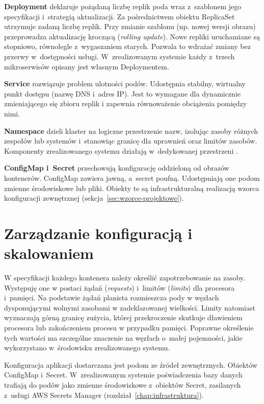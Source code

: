 \textbf{Deployment} deklaruje pożądaną liczbę replik poda wraz z~szablonem jego specyfikacji i~strategią
aktualizacji. Za pośrednictwem obiektu ReplicaSet utrzymuje zadaną liczbę replik. Przy zmianie szablonu (np.
nowej wersji obrazu) przeprowadza aktualizację kroczącą (\emph{rolling update}). Nowe repliki uruchamiane są
stopniowo, równolegle z~wygaszaniem starych. Pozwala to wdrażać zmiany bez przerwy w~dostępności usługi.
W~zrealizowanym systemie każdy z~trzech mikroserwisów opisany jest własnym Deploymentem.

\textbf{Service} rozwiązuje problem ulotności podów. Udostępnia stabilny, wirtualny punkt dostępu (nazwę DNS
i~adres IP). Jest to wymagane dla dynamicznie zmieniającego się zbioru replik i zapewnia równoważenie obciążenia pomiędzy nimi.

\textbf{Namespace} dzieli klaster na logiczne przestrzenie nazw, izolując zasoby różnych zespołów lub systemów
i~stanowiąc granicę dla uprawnień oraz limitów zasobów. Komponenty zrealizowanego systemu działają w~dedykowanej
przestrzeni .

\textbf{ConfigMap i~Secret} przechowują konfigurację oddzieloną od obrazów kontenerów. ConfigMap zawiera jawną,
a~secret poufną. Udostępniają one podom zmienne środowiskowe lub pliki. Obiekty te są infrastrukturalną realizacją 
wzorca konfiguracji zewnętrznej (sekcja~\ref{sec:wzorce-projektowe}).

\section{Zarządzanie konfiguracją i skalowaniem}
\label{sec:konfiguracja-i-skalowanie}

W specyfikacji każdego kontenera należy określić zapotrzebowanie na zasoby. Występuję one w postaci żądań (\emph{requests})
i~limitów (\emph{limits}) dla procesora i~pamięci. Na podstawie żądań planista rozmieszcza pody w węzłach
dysponującymi wolnymi zasobami w zadeklarowanej wielkości. Limity natomiast wyznaczają górną granicę zużycia, której 
przekroczenie skutkuje dławieniem procesora lub zakończeniem procesu w przypadku pamięci.
Poprawne określenie tych wartości ma szczególne znaczenie na węzłach o~małej pojemności, jakie wykorzystano
w~środowisku zrealizowanego systemu.

Konfiguracja aplikacji dostarczana jest podom ze źródeł zewnętrznych. Obiektów ConfigMap i~Secret. 
W~zrealizowanym systemie poświadczenia bazy danych trafiają do podów jako zmienne środowiskowe z~obiektów Secret, 
zasilanych z~usługi AWS Secrets Manager (rozdział~\ref{chap:infrastruktura}).

